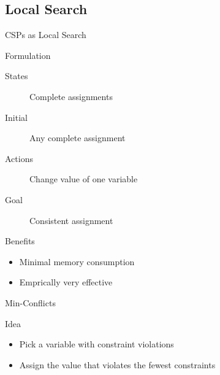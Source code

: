 \documentclass[14pt]{beamer}
\begin{document}
\subsection{Local Search}
\begin{frame}{CSPs as Local Search}
	\begin{block}{Formulation}
		\begin{description}
			\item[States] Complete assignments
			\item[Initial] Any complete assignment
			\item[Actions] Change value of one variable
			\item[Goal] Consistent assignment
		\end{description}
	\end{block}
	\pause
	\begin{block}{Benefits}
		\begin{itemize}
			\item Minimal memory consumption
			\item Emprically very effective
		\end{itemize}
	\end{block}
\end{frame}
\begin{frame}{Min-Conflicts}
	\begin{block}{Idea}
		\begin{itemize}
			\item Pick a variable with constraint violations
			\item Assign the value that violates the fewest constraints
		\end{itemize}
	\end{block}
	\begin{center}
	\end{center}
\end{frame}
\end{document}
